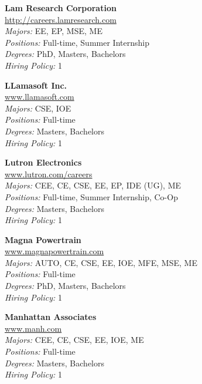 \documentclass[twoside]{article}
\begin{document}
\begin{center}
\begin{multicols}{3}
\begin{minipage}{.9\columnwidth}{\Large\bf Lam Research Corporation }\\
	\url{http://careers.lamresearch.com}\\
	\emph{Majors:} EE, EP, MSE, ME\\
	\emph{Positions:} Full-time, Summer Internship\\
	\emph{Degrees:} PhD, Masters, Bachelors\\
	\emph{Hiring Policy:} 1\\
\end{minipage}
 
\begin{minipage}{.9\columnwidth}{\Large\bf LLamasoft Inc. }\\
	\url{www.llamasoft.com}\\
	\emph{Majors:} CSE, IOE\\
	\emph{Positions:} Full-time\\
	\emph{Degrees:} Masters, Bachelors\\
	\emph{Hiring Policy:} 1\\
\end{minipage}
 
\begin{minipage}{.9\columnwidth}{\Large\bf Lutron Electronics }\\
	\url{www.lutron.com/careers}\\
	\emph{Majors:} CEE, CE, CSE, EE, EP, IDE (UG), ME\\
	\emph{Positions:} Full-time, Summer Internship, Co-Op\\
	\emph{Degrees:} Masters, Bachelors\\
	\emph{Hiring Policy:} 1\\
\end{minipage}
 
\begin{minipage}{.9\columnwidth}{\Large\bf Magna Powertrain }\\
	\url{www.magnapowertrain.com}\\
	\emph{Majors:} AUTO, CE, CSE, EE, IOE, MFE, MSE, ME\\
	\emph{Positions:} Full-time\\
	\emph{Degrees:} PhD, Masters, Bachelors\\
	\emph{Hiring Policy:} 1\\
\end{minipage}
 
\begin{minipage}{.9\columnwidth}{\Large\bf Manhattan Associates }\\
	\url{www.manh.com}\\
	\emph{Majors:} CEE, CE, CSE, EE, IOE, ME\\
	\emph{Positions:} Full-time\\
	\emph{Degrees:} Masters, Bachelors\\
	\emph{Hiring Policy:} 1\\
\end{minipage}
 

\end{multicols}
\end{center}
\end{document}
